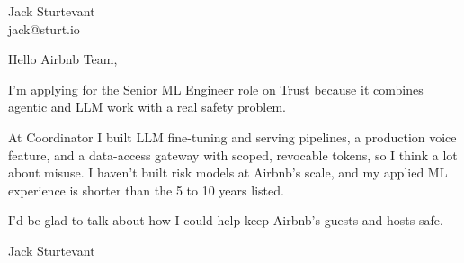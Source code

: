 \documentclass[11pt]{article}
\begin{document}
\raggedright

{\namefont\fontsize{20pt}{24pt}\selectfont Jack Sturtevant}\\[-0.3em]
jack@sturt.io

\vspace{1.2em}

Hello Airbnb Team,

I'm applying for the Senior ML Engineer role on Trust because it combines agentic and LLM work with a real safety problem.

At Coordinator I built LLM fine-tuning and serving pipelines, a production voice feature, and a data-access gateway with scoped, revocable tokens, so I think a lot about misuse. I haven't built risk models at Airbnb's scale, and my applied ML experience is shorter than the 5 to 10 years listed.

I'd be glad to talk about how I could help keep Airbnb's guests and hosts safe.

\vspace{0.6em}
Jack Sturtevant
\end{document}
